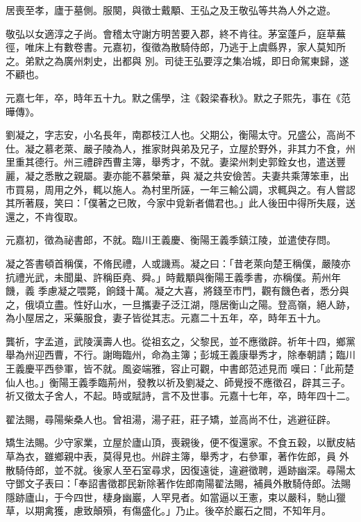\begin{pinyinscope}
 居喪至孝，廬于墓側。服闋，與徵士戴顒、王弘之及王敬弘等共為人外之遊。



 敬弘以女適淳之子尚。會稽太守謝方明苦要入郡，終不肯往。茅室蓬戶，庭草蕪徑，唯床上有數卷書。元嘉初，復徵為散騎侍郎，乃逃于上虞縣界，家人莫知所之。弟默之為廣州刺史，出都與
 別。司徒王弘要淳之集冶城，即日命駕東歸，遂不顧也。



 元嘉七年，卒，時年五十九。默之儒學，注《穀梁春秋》。默之子熙先，事在《范曄傳》。



 劉凝之，字志安，小名長年，南郡枝江人也。父期公，衡陽太守。兄盛公，高尚不仕。凝之慕老萊、嚴子陵為人，推家財與弟及兄子，立屋於野外，非其力不食，州里重其德行。州三禮辟西曹主簿，舉秀才，不就。妻梁州刺史郭銓女也，遣送豐麗，凝之悉散之親屬。妻亦能不慕榮華，與
 凝之共安儉苦。夫妻共乘薄笨車，出市買易，周用之外，輒以施人。為村里所誣，一年三輸公調，求輒與之。有人嘗認其所著屐，笑曰：「僕著之已敗，今家中覓新者備君也。」此人後田中得所失屐，送還之，不肯復取。



 元嘉初，徵為祕書郎，不就。臨川王義慶、衡陽王義季鎮江陵，並遣使存問。



 凝之答書頓首稱僕，不脩民禮，人或譏焉。凝之曰：「昔老萊向楚王稱僕，嚴陵亦抗禮光武，未聞巢、許稱臣堯、舜。」時戴顒與衡陽王義季書，亦稱僕。荊州年饑，義
 季慮凝之喂斃，餉錢十萬。凝之大喜，將錢至市門，觀有饑色者，悉分與之，俄頃立盡。性好山水，一旦攜妻子泛江湖，隱居衡山之陽。登高嶺，絕人跡，為小屋居之，采藥服食，妻子皆從其志。元嘉二十五年，卒，時年五十九。



 龔祈，字孟道，武陵漢壽人也。從祖玄之，父黎民，並不應徵辟。祈年十四，鄉黨舉為州迎西曹，不行。謝晦臨州，命為主簿；彭城王義康舉秀才，除奉朝請；臨川王義慶平西參軍，皆不就。風姿端雅，容止可觀，中書郎范述見而
 嘆曰：「此荊楚仙人也。」衡陽王義季臨荊州，發教以祈及劉凝之、師覺授不應徵召，辟其三子。祈又徵太子舍人，不起。時或賦詩，言不及世事。元嘉十七年，卒，時年四十二。



 翟法賜，尋陽柴桑人也。曾祖湯，湯子莊，莊子矯，並高尚不仕，逃避征辟。



 矯生法賜。少守家業，立屋於廬山頂，喪親後，便不復還家。不食五穀，以獸皮結草為衣，雖鄉親中表，莫得見也。州辟主簿，舉秀才，右參軍，著作佐郎，員
 外散騎侍郎，並不就。後家人至石室尋求，因復遠徙，違避徵聘，遁跡幽深。尋陽太守鄧文子表曰：「奉詔書徵郡民新除著作佐郎南陽翟法賜，補員外散騎侍郎。法賜隱跡廬山，于今四世，棲身幽巖，人罕見者。如當逼以王憲，束以嚴科，馳山獵草，以期禽獲，慮致顛殞，有傷盛化。」乃止。後卒於巖石之間，不知年月。




\end{pinyinscope}
